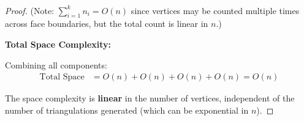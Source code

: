 ﻿﻿\documentclass[12pt,a4paper]{article}
\theoremstyle{definition}
\theoremstyle{remark}
\begin{document}
\begin{proof}
	(Note: $\sum_{i=1}^{k} n_i = O(n)$ since vertices may be counted multiple times across face boundaries, but the total count is linear in $n$.)

	\textbf{Total Space Complexity:}

	Combining all components:
	\begin{align*}
		\text{Total Space} & = O(n) + O(n) + O(n) + O(n) = O(n)
	\end{align*}

	The space complexity is \textbf{linear} in the number of vertices, independent of the number of triangulations generated (which can be exponential in $n$).
\end{proof}








\end{document}
